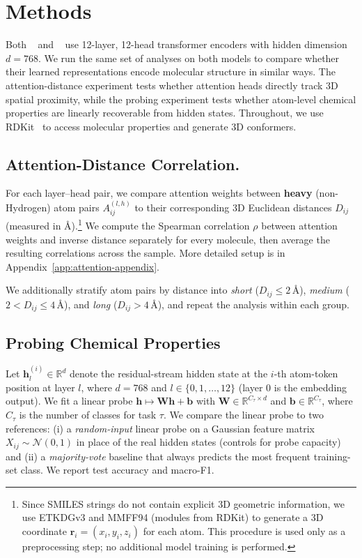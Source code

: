 \section{Methods}
\label{sec:methods}

Both \molm~\citep{ross2022largescalechemicallanguagerepresentations} and \smi~\citep{soares2024smi} use 12-layer, 12-head transformer encoders with hidden dimension $d=768$. We run the same set of analyses on both models to compare whether their learned representations encode molecular structure in similar ways. The attention-distance experiment tests whether attention heads directly track 3D spatial proximity, while the probing experiment tests whether atom-level chemical properties are linearly recoverable from hidden states. Throughout, we use RDKit~\cite{rdkit} to access molecular properties and generate 3D conformers.

\subsection{Attention-Distance Correlation.} For each layer--head pair, we compare attention weights between \textbf{heavy} (non-Hydrogen) atom pairs $A_{ij}^{(l,h)}$ to their corresponding 3D Euclidean distances $D_{ij}$ (measured in \AA).\footnote{Since SMILES strings do not contain explicit 3D geometric information, we use ETKDGv3 and MMFF94 (modules from RDKit) to generate a 3D coordinate $\mathbf{r}_i=(x_i,y_i,z_i)$ for each atom. This procedure is used only as a preprocessing step; no additional model training is performed.} We compute the Spearman correlation $\rho$ between attention weights and inverse distance separately for every molecule, then average the resulting correlations across the sample. More detailed setup is in Appendix~\ref{app:attention-appendix}.

We additionally stratify atom pairs by distance into \emph{short} ($D_{ij}\le2$\,\AA), \emph{medium} ($2<D_{ij}\le4$\,\AA), and \emph{long} ($D_{ij}>4$\,\AA), and repeat the analysis within each group.

\subsection{Probing Chemical Properties}
Let $\mathbf{h}^{(i)}_l \in \mathbb{R}^d$ denote the residual-stream hidden state at the $i$-th atom-token position at layer $l$, where $d{=}768$ and $l \in \{0, 1, \dots, 12\}$ (layer $0$ is the embedding output). We fit a linear probe $\mathbf{h} \mapsto \mathbf{W}\mathbf{h} + \mathbf{b}$ with $\mathbf{W} \in \mathbb{R}^{C_\tau \times d}$ and $\mathbf{b} \in \mathbb{R}^{C_\tau}$, where $C_\tau$ is the number of classes for task $\tau$. We compare the linear probe to two references: (i) a \emph{random-input} linear probe on a Gaussian feature matrix $X_{ij} \sim \mathcal{N}(0, 1)$ in place of the real hidden states (controls for probe capacity) and (ii) a \emph{majority-vote} baseline that always predicts the most frequent training-set class. We report test accuracy and macro-F1.

